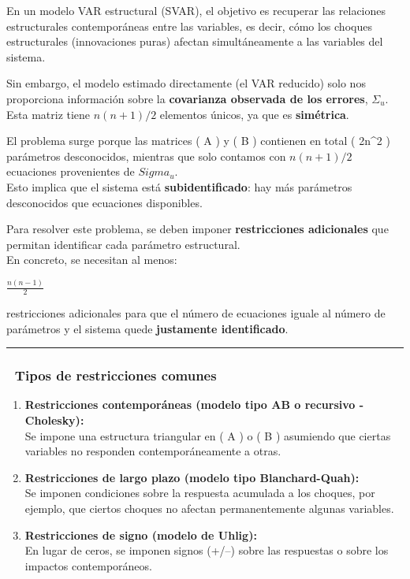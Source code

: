 \documentclass[
  spanish,
  letterpaper,
  DIV=11,
  numbers=noendperiod]{scrartcl}
\begin{document}
En un modelo VAR estructural (SVAR), el objetivo es recuperar las
relaciones estructurales contemporáneas entre las variables, es decir,
cómo los choques estructurales (innovaciones puras) afectan
simultáneamente a las variables del sistema.

Sin embargo, el modelo estimado directamente (el VAR reducido) solo nos
proporciona información sobre la \textbf{covarianza observada de los
errores}, \(\Sigma_u\).\\
Esta matriz tiene \(n(n + 1)/2\) elementos únicos, ya que es
\textbf{simétrica}.

El problema surge porque las matrices ( A ) y ( B ) contienen en total (
2n\^{}2 ) parámetros desconocidos, mientras que solo contamos con
\(n(n + 1)/2\) ecuaciones provenientes de \(Sigma_u\).\\
Esto implica que el sistema está \textbf{subidentificado}: hay más
parámetros desconocidos que ecuaciones disponibles.

Para resolver este problema, se deben imponer \textbf{restricciones
adicionales} que permitan identificar cada parámetro estructural.\\
En concreto, se necesitan al menos:

\(\frac{n(n - 1)}{2}\)

restricciones adicionales para que el número de ecuaciones iguale al
número de parámetros y el sistema quede \textbf{justamente
identificado}.

\begin{center}\rule{0.5\linewidth}{0.5pt}\end{center}

\subsubsection{🧩 Tipos de restricciones
comunes}\label{tipos-de-restricciones-comunes}

\begin{enumerate}
\def\labelenumi{\arabic{enumi}.}
\item
  \textbf{Restricciones contemporáneas (modelo tipo AB o recursivo -
  Cholesky):}\\
  Se impone una estructura triangular en ( A ) o ( B ) asumiendo que
  ciertas variables no responden contemporáneamente a otras.
\item
  \textbf{Restricciones de largo plazo (modelo tipo Blanchard-Quah):}\\
  Se imponen condiciones sobre la respuesta acumulada a los choques, por
  ejemplo, que ciertos choques no afectan permanentemente algunas
  variables.
\item
  \textbf{Restricciones de signo (modelo de Uhlig):}\\
  En lugar de ceros, se imponen signos (+/--) sobre las respuestas o
  sobre los impactos contemporáneos.
\end{enumerate}
\end{document}
